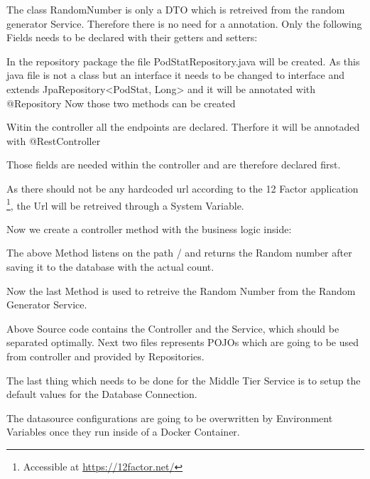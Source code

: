 The class RandomNumber is only a DTO which is retreived from the random generator Service. Therefore there is no need for a annotation.
Only the following Fields needs to be declared with their getters and setters:


In the repository package the file PodStatRepository.java will be created.
As this java file is not a class but an interface it needs to be changed to interface and extends JpaRepository<PodStat, Long>
and it will be annotated with @Repository
Now those two methods can be created 


Witin the controller all the endpoints are declared. Therfore it will be annotaded with @RestController

Those fields are needed within the controller and are therefore declared first.

\newpage
As there should not be any hardcoded url according to the 12 Factor application \footnote{Accessible at \url{https://12factor.net/}}, the Url will be retreived through a System Variable.

Now we create a controller method with the business logic inside:


The above Method listens on the path / and returns the Random number after saving it to the database with the actual count.

Now the last Method is used to retreive the Random Number from the Random Generator Service.


Above Source code contains the Controller and the Service, which should be separated optimally.
Next two files represents POJOs which are going to be used from controller and provided by Repositories.

The last thing which needs to be done for the Middle Tier Service is to setup the default values for the Database Connection.

The datasource configurations are going to be overwritten by Environment Variables once they run inside of a Docker Container.


